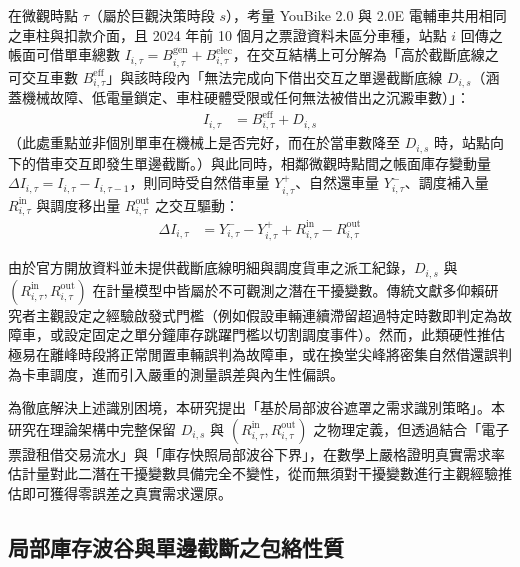 在微觀時點 $\tau$（屬於巨觀決策時段 $s$），考量 YouBike 2.0 與 2.0E 電輔車共用相同之車柱與扣款介面，且 2024 年前 10 個月之票證資料未區分車種，站點 $i$ 回傳之帳面可借單車總數 $I_{i,\tau} = B^{\text{gen}}_{i,\tau} + B^{\text{elec}}_{i,\tau}$，在交互結構上可分解為「高於截斷底線之可交互車數 $B^{\text{eff}}_{i,\tau}$」與該時段內「無法完成向下借出交互之單邊截斷底線 $D_{i,s}$（涵蓋機械故障、低電量鎖定、車柱硬體受限或任何無法被借出之沉澱車數）」：
\begin{align}
I_{i,\tau} &= B^{\text{eff}}_{i,\tau} + D_{i,s}
\end{align}
（此處重點並非個別單車在機械上是否完好，而在於當車數降至 $D_{i,s}$ 時，站點向下的借車交互即發生單邊截斷。）與此同時，相鄰微觀時點間之帳面庫存變動量 $\Delta I_{i,\tau} = I_{i,\tau} - I_{i,\tau-1}$，則同時受自然借車量 $Y^+_{i,\tau}$、自然還車量 $Y^-_{i,\tau}$、調度補入量 $R^{\text{in}}_{i,\tau}$ 與調度移出量 $R^{\text{out}}_{i,\tau}$ 之交互驅動：
\begin{align}
\Delta I_{i,\tau} &= Y^-_{i,\tau} - Y^+_{i,\tau} + R^{\text{in}}_{i,\tau} - R^{\text{out}}_{i,\tau}
\end{align}

由於官方開放資料並未提供截斷底線明細與調度貨車之派工紀錄，$D_{i,s}$ 與 $(R^{\text{in}}_{i,\tau}, R^{\text{out}}_{i,\tau})$ 在計量模型中皆屬於不可觀測之潛在干擾變數。傳統文獻多仰賴研究者主觀設定之經驗啟發式門檻（例如假設車輛連續滯留超過特定時數即判定為故障車，或設定固定之單分鐘庫存跳躍門檻以切割調度事件）。然而，此類硬性推估極易在離峰時段將正常閒置車輛誤判為故障車，或在換堂尖峰將密集自然借還誤判為卡車調度，進而引入嚴重的測量誤差與內生性偏誤。

為徹底解決上述識別困境，本研究提出「基於局部波谷遮罩之需求識別策略」。本研究在理論架構中完整保留 $D_{i,s}$ 與 $(R^{\text{in}}_{i,\tau}, R^{\text{out}}_{i,\tau})$ 之物理定義，但透過結合「電子票證租借交易流水」與「庫存快照局部波谷下界」，在數學上嚴格證明真實需求率估計量對此二潛在干擾變數具備完全不變性，從而無須對干擾變數進行主觀經驗推估即可獲得零誤差之真實需求還原。

\subsection{局部庫存波谷與單邊截斷之包絡性質}\label{subsec:trough_envelope}

